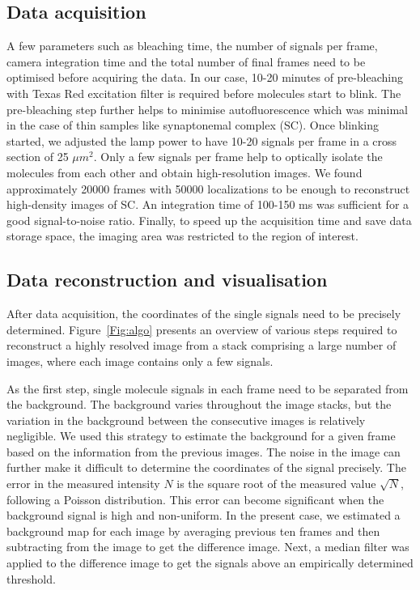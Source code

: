 \documentclass[9pt,twocolumn,twoside]{pnas-new}
\begin{document}
\subsection*{Data acquisition}
A few parameters such as bleaching time, the number of signals per frame, camera integration time and the total number of final frames need to be optimised before acquiring the data. In our case, 10-20 minutes of pre-bleaching with Texas Red excitation filter is required before molecules start to blink. The pre-bleaching step further helps to minimise autofluorescence which was minimal in the case of thin samples like synaptonemal complex (SC).  Once blinking started, we adjusted the lamp power to have 10-20 signals per frame in a cross section of 25 $\mu m^2$.  Only a few signals per frame help to optically isolate the molecules from each other and obtain high-resolution images. We found approximately 20000 frames with 50000 localizations to be enough to reconstruct high-density images of SC. An integration time of 100-150 ms was sufficient for a good signal-to-noise ratio. Finally, to speed up the acquisition time and save data storage space, the imaging area was restricted to the region of interest. 

\subsection*{Data reconstruction and visualisation}
After data acquisition, the coordinates of the single signals need to be precisely determined.  Figure~\ref{Fig:algo} presents an overview of various steps required to reconstruct a highly resolved image from a stack comprising a large number of images, where each image contains only a few signals.  

As the first step, single molecule signals in each frame need to be separated from the background. The background varies throughout the image stacks, but the variation in the background between the consecutive images is relatively negligible. We used this strategy to estimate the background for a given frame based on the information from the previous images.  The noise in the image can further make it difficult to determine the coordinates of the signal precisely. The error in the measured intensity $N$ is the square root of the measured value $\sqrt N$, following a Poisson distribution. This error can become significant when the background signal is high and non-uniform. In the present case, we estimated a background map for each image by averaging previous ten frames and then subtracting from the image to get the difference image. Next, a median filter was applied to the difference image to get the signals above an empirically determined threshold. 
\end{document}
